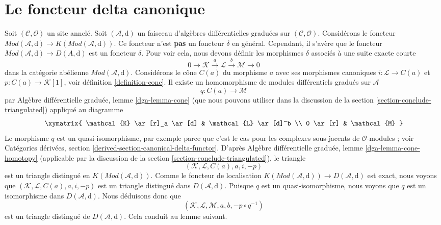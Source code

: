 \section{Le foncteur delta canonique}
\label{section-canonical-delta-functor}

\noindent
Soit $(\mathcal{C}, \mathcal{O})$ un site annelé. Soit
$(\mathcal{A}, \text{d})$ un faisceau d'algèbres différentielles graduées
sur $(\mathcal{C}, \mathcal{O})$.
Considérons le foncteur
$\textit{Mod}(\mathcal{A}, \text{d}) \to
K(\textit{Mod}(\mathcal{A}, \text{d}))$.
Ce foncteur n'est {\bf pas} un foncteur $\delta$ en
général. Cependant, il s'avère que le foncteur
$\textit{Mod}(\mathcal{A}, \text{d}) \to D(A, \text{d})$ est
un foncteur $\delta$. Pour voir cela, nous devons définir
les morphismes $\delta$ associés à une suite exacte courte
$$
0 \to \mathcal{K} \xrightarrow{a} \mathcal{L} \xrightarrow{b} \mathcal{M} \to 0
$$
dans la catégorie abélienne $\textit{Mod}(\mathcal{A}, \text{d})$.
Considérons le cône $C(a)$ du morphisme $a$ avec ses morphismes
canoniques $i : \mathcal{L} \to C(a)$ et
$p : C(a) \to \mathcal{K}[1]$, voir définition \ref{definition-cone}. Il existe un
homomorphisme de modules différentiels gradués sur $\mathcal{A}$
$$ q :
C(a) \longrightarrow \mathcal{M}
$$ par
Algèbre différentielle graduée, lemme \ref{dga-lemma-cone}
(que nous pouvons utiliser dans la discussion
de la section \ref{section-conclude-triangulated})
appliqué au
diagramme $$
\xymatrix{
\mathcal{K} \ar[r]_a \ar[d]
& \mathcal{L} \ar[d]^b \\
0 \ar[r]
& \mathcal{M}
}
$$
Le morphisme $q$ est un quasi-isomorphisme, par exemple parce
que c'est le cas pour les complexes sous-jacents de $\mathcal{O}$-modules ;
voir
Catégories dérivées, section \ref{derived-section-canonical-delta-functor}.
D'après Algèbre différentielle graduée, lemme \ref{dga-lemma-cone-homotopy} (applicable
par la discussion de la section
\ref{section-conclude-triangulated}), le
triangle
$$
(\mathcal{K}, \mathcal{L}, C(a), a, i, -p)
$$ est un
triangle distingué en $K(\textit{Mod}(\mathcal{A}, \text{d}))$. Comme le foncteur
de localisation
$K(\textit{Mod}(\mathcal{A}, \text{d})) \to D(\mathcal{A}, \text{d})$ est exact,
nous voyons que $(\mathcal{K}, \mathcal{L}, C(a), a, i, -p)$ est un
triangle distingué
dans $D(\mathcal{A}, \text{d})$. Puisque $q$ est un quasi-isomorphisme,
nous voyons que $q$ est un isomorphisme dans $D(\mathcal{A}, \text{d})$.
Nous déduisons
donc que $$
(\mathcal{K}, \mathcal{L}, \mathcal{M}, a, b, -p \circ q^{-1})
$$
est un triangle distingué de $D(\mathcal{A}, \text{d})$.
Cela conduit au lemme suivant.

